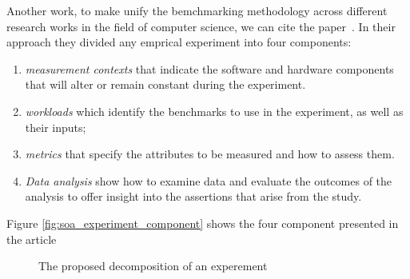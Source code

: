 Another work, to make unify the bemchmarking methodology across different research works in the field of computer science, we can cite the paper~\cite{stephen_evaluate_2012}. In their approach they  divided any emprical experiment into four  components:

\begin{enumerate}
    \item \emph{measurement contexts} that indicate the software and hardware components that will alter or remain constant during the experiment.
    \item \emph{workloads} which identify the benchmarks to use in the experiment, as well as their inputs; 
    \item \emph{metrics} that specify the attributes to be measured and how to assess them. 
    \item \emph{Data analysis} show how to examine data and evaluate the outcomes of the analysis to offer insight into the assertions that arise from the study.
\end{enumerate}

Figure \ref{fig:soa_experiment_component} shows the four component presented in the article~~\cite{stephen_evaluate_2012} 


\begin{figure}[!hbt]
    \caption{The proposed decomposition of an experement~\cite{stephen_evaluate_2012}}\label{fig:soa_expermiment_component}
\end{figure}

